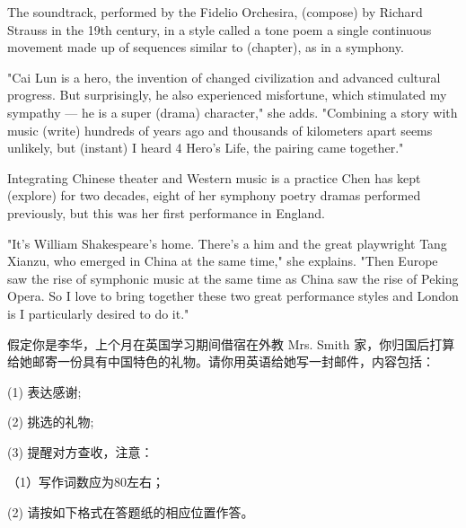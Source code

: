 \documentclass{英语试卷}
\begin{document}
\par The soundtrack, performed by the Fidelio Orchesira,  (compose) by Richard Strauss in the 19th century, in a style called a tone poem a single continuous movement made up of sequences similar to  (chapter), as in a symphony.\par
\par "Cai Lun is a hero, the invention of  changed civilization and advanced cultural progress. But surprisingly, he also experienced misfortune, which stimulated my sympathy — he is a super  (drama) character," she adds. "Combining a story with music  (write) hundreds of years ago and thousands of kilometers apart seems unlikely, but  (instant) I heard 4 Hero's Life, the pairing came together."\par
\par Integrating Chinese theater and Western music is a practice Chen has kept  (explore) for two decades, eight of her symphony poetry dramas performed previously, but this was her first performance in England.\par
\par "It's William Shakespeare's home. There's a  him and the great playwright Tang Xianzu, who emerged in China at the same time," she explains. "Then Europe saw the rise of symphonic music at the same time as China saw the rise of Peking Opera. So I love to bring together these two great performance styles and London is  I particularly desired to do it."\par
{}
\par 假定你是李华，上个月在英国学习期间借宿在外教 Mrs. Smith 家，你归国后打算给她邮寄一份具有中国特色的礼物。请你用英语给她写一封邮件，内容包括：\par
\par (1) 表达感谢;\par
\par (2) 挑选的礼物;\par
\par (3) 提醒对方查收，注意：\par
\par （1）写作词数应为80左右；\par
\par (2) 请按如下格式在答题纸的相应位置作答。\par
\par\vspace{0.4em}
\end{document}
